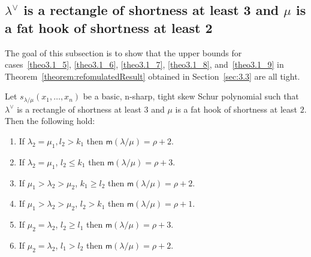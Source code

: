 \documentclass[ALCO,ThmDefs,Unicode,epreuves]{cedram}
\newcommand{\msf}{\mathsf{m}}
\begin{document}
\subsection{\texorpdfstring{$\lambda^\vee$}{lambda vee} is a rectangle of shortness at least 3 and \texorpdfstring{$\mu$}{mu} is a fat hook of shortness at least 2}

The goal of this subsection is to show that the upper bounds for cases~\ref{theo3.1_5}, \ref{theo3.1_6}, \ref{theo3.1_7}, \ref{theo3.1_8}, and~\ref{theo3.1_9} in Theorem~\ref{theorem:refomulatedResult} obtained in Section~\ref{sec:3.3} are all tight.

\begin{theorem}
\label{thm:necessaryshort3}
Let $s_{\lambda/\mu}(x_1,\ldots,x_n)$ be a basic, n-sharp, tight skew Schur polynomial such that $\lambda^\vee$ is a rectangle of shortness at least $3$ and $\mu$ is a fat hook of shortness at least $2$. Then the following hold:
\begin{enumerate}[label=(\Roman*)]
 \item\label{theo4.6_1} If $\lambda_2 = \mu_1, l_2 > k_1$ then $\msf (\lambda/\mu) = \rho+2$.
 \item\label{theo4.6_2} If $\lambda_2 = \mu_1$, $l_2 \leq k_1$ then $\msf (\lambda/\mu) = \rho+3$.
 \item\label{theo4.6_3} If $\mu_1 > \lambda_2 > \mu_2$, $k_1 \geq l_2$ then $\msf (\lambda/\mu) = \rho+2$.
 \item\label{theo4.6_4} If $\mu_1 > \lambda_2 > \mu_2$, $l_2 > k_1$ then $\msf (\lambda/\mu) = \rho+1$.
 \item\label{theo4.6_5} If $\mu_2 = \lambda_2$, $l_2 \geq l_1$ then $\msf (\lambda/\mu) = \rho+3$.
 \item\label{theo4.6_6} If $\mu_2 = \lambda_2$, $l_1 > l_2$ then $\msf (\lambda/\mu) = \rho+2$.
\end{enumerate}
\end{theorem}
\end{document}
